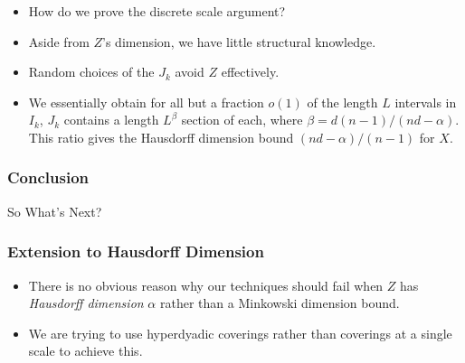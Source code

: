 \documentclass[handout,usenames,dvipsnames]{beamer}
\begin{document}
\begin{frame}
\begin{figure}
    \end{figure}

    \begin{itemize}
        \item How do we prove the discrete scale argument?

        \pause
        \item Aside from $Z$'s dimension, we have little structural knowledge.

        \pause
        \item Random choices of the $J_k$ avoid $Z$ effectively.

        \item We essentially obtain for all but a fraction $o(1)$ of the length $L$ intervals in $I_k$, $J_k$ contains a length $L^\beta$ section of each, where $\beta = d(n-1)/(nd - \alpha)$. This ratio gives the Hausdorff dimension bound $(nd-\alpha)/(n-1)$ for $X$.
    \end{itemize}
\end{frame}

\begin{frame}
    \frametitle{Conclusion}

    {\Huge So What's Next?}
\end{frame}

\begin{frame}
    \frametitle{Extension to Hausdorff Dimension}

    \begin{itemize}
        \item There is no obvious reason why our techniques should fail when $Z$ has {\it Hausdorff dimension} $\alpha$ rather than a Minkowski dimension bound.

        \pause
        \item We are trying to use hyperdyadic coverings rather than coverings at a single scale to achieve this.
    \end{itemize}
\end{frame}
\end{document}
